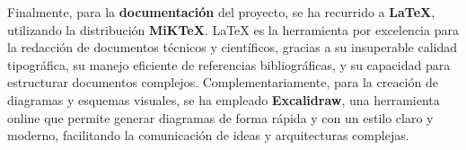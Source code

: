 Finalmente, para la \textbf{documentación} del proyecto, se ha recurrido a \textbf{LaTeX}, utilizando la distribución \textbf{MiKTeX}. LaTeX es la herramienta por excelencia para la redacción de documentos técnicos y científicos, gracias a su insuperable calidad tipográfica, su manejo eficiente de referencias bibliográficas, y su capacidad para estructurar documentos complejos. Complementariamente, para la creación de diagramas y esquemas visuales, se ha empleado \textbf{Excalidraw}, una herramienta online que permite generar diagramas de forma rápida y con un estilo claro y moderno, facilitando la comunicación de ideas y arquitecturas complejas.